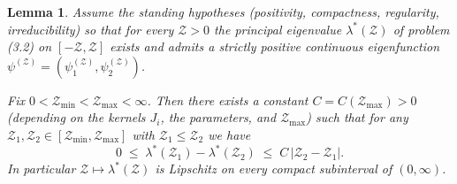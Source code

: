 \documentclass[a4paper,11pt]{amsart}
\newtheorem{lemma}[theorem]{Lemma}
\theoremstyle{definition}
\numberwithin{equation}{section}
\theoremstyle{definition}
\begin{document}
\begin{lemma}\label{lem:lambdaLipschitz}
Assume the standing hypotheses (positivity, compactness, regularity, irreducibility) so that for every $\mathcal Z>0$ the principal eigenvalue
$\lambda^\ast(\mathcal Z)$ of problem (3.2) on $[-\mathcal Z,\mathcal Z]$ exists and admits a strictly positive continuous eigenfunction
$\psi^{(\mathcal Z)}=(\psi_1^{(\mathcal Z)},\psi_2^{(\mathcal Z)})$.

Fix $0<\mathcal Z_{\min}<\mathcal Z_{\max}<\infty$. Then there exists a constant $C=C(\mathcal Z_{\max})>0$ (depending on the kernels $J_i$, the parameters, and $\mathcal Z_{\max}$) such that for any
$\mathcal Z_1,\mathcal Z_2\in[\mathcal Z_{\min},\mathcal Z_{\max}]$ with $\mathcal Z_1\le\mathcal Z_2$ we have
\[
0 \;\leq\; \lambda^\ast(\mathcal Z_1) - \lambda^\ast(\mathcal Z_2)
\;\leq\; C\,|\mathcal Z_2-\mathcal Z_1| .
\]
In particular \(\mathcal Z\mapsto\lambda^\ast(\mathcal Z)\) is Lipschitz on every compact subinterval of \((0,\infty)\).
\end{lemma}
\end{document}
